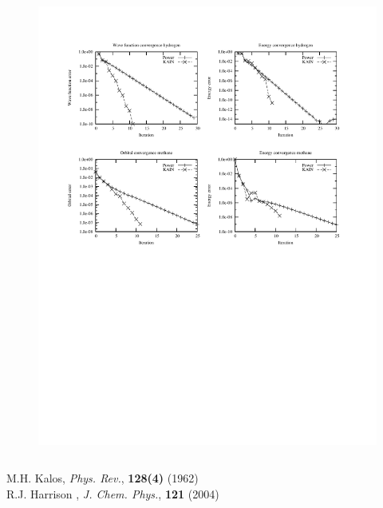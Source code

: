 \begin{frame}
\begin{columns}
\begin{column}[b]{0.55\textwidth}
    \begin{figure}
        \includegraphics[scale=0.6, clip, viewport = 50 350 300 540]
        {figures/convergence.pdf}
    \end{figure}

    \end{column}
    \end{columns}
    \centering
    \vspace{2mm}
    \tiny
    M.H. Kalos, 
    {\it Phys. Rev.}, 
    \textbf{128(4)}
    (1962)\\
    R.J. Harrison \etal,
    {\it J. Chem. Phys.}, 
    \textbf{121}
    (2004)
\end{frame}

